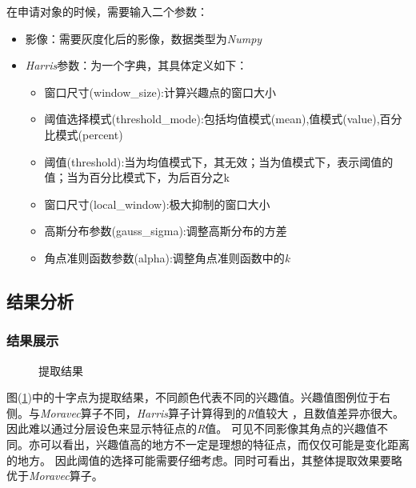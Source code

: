         在申请对象的时候，需要输入二个参数：
        \begin{itemize}
            \item 影像：需要灰度化后的影像，数据类型为\textit{Numpy}
            \item \textit{Harris}参数：为一个字典，其具体定义如下：
            \begin{itemize}
                \item 窗口尺寸(window\_size):计算兴趣点的窗口大小
                \item 阈值选择模式(threshold\_mode):包括均值模式(mean),值模式(value),百分比模式(percent)
                \item 阈值(threshold):当为均值模式下，其无效；当为值模式下，表示阈值的值；当为百分比模式下，为后百分之k
                \item 窗口尺寸(local\_window):极大抑制的窗口大小
                \item 高斯分布参数(gauss\_sigma):调整高斯分布的方差
                \item 角点准则函数参数(alpha):调整角点准则函数中的\textit{k}
            \end{itemize}
        \end{itemize}

\subsection{结果分析}
    \subsubsection{结果展示}
    \begin{figure}[H]
        \centering
        \caption{提取结果}
        \label{harris_result}
    \end{figure}
    图(\ref{harris_result})中的十字点为提取结果，不同颜色代表不同的兴趣值。兴趣值图例位于右侧。与\textit{Moravec}算子不同，\textit{Harris}算子计算得到的\textit{R}值较大
    ，且数值差异亦很大。因此难以通过分层设色来显示特征点的\textit{R}值。
        可见不同影像其角点的兴趣值不同。亦可以看出，兴趣值高的地方不一定是理想的特征点，而仅仅可能是变化距离的地方。
        因此阈值的选择可能需要仔细考虑。同时可看出，其整体提取效果要略优于\textit{Moravec}算子。
    

